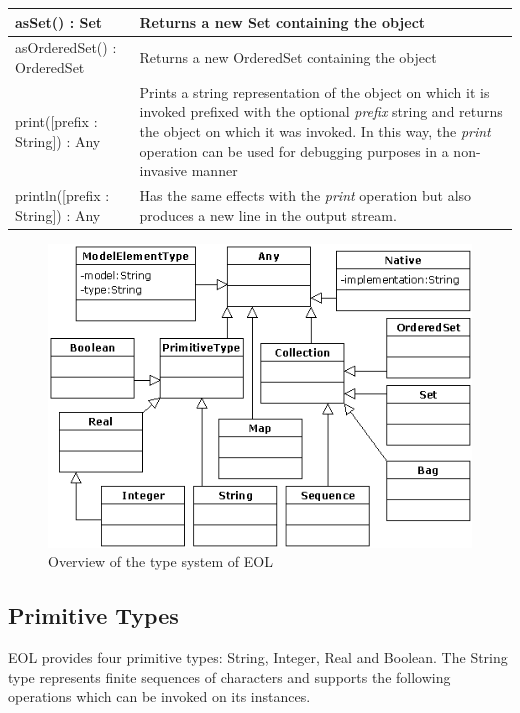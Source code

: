 \begin{longtable} {|p{5.5cm}|p{6.5cm}|}
			asSet() : Set & Returns a new Set containing the object \\\hline
			
			asOrderedSet() : OrderedSet & Returns a new OrderedSet containing the object \\\hline
			
			print([prefix : String]) : Any & Prints a string representation of the object on which it is invoked prefixed with the optional \emph{prefix} string and returns the object on which it was invoked. In this way, the \emph{print} operation can be used for debugging purposes in a non-invasive manner\\\hline
			
			println([prefix : String]) : Any & Has the same effects with the \emph{print} operation but also produces a new line in the output stream. \\\hline

\end{longtable}

\clearpage

\begin{figure}
	\centering
		\includegraphics{images/EOLTypes.png}
	\caption{Overview of the type system of EOL}
	\label{fig:EOLTypes}
\end{figure}

\subsection{Primitive Types} 

EOL provides four primitive types: String, Integer, Real and Boolean. The String type represents finite sequences of characters and supports the following operations which can be invoked on its instances.

